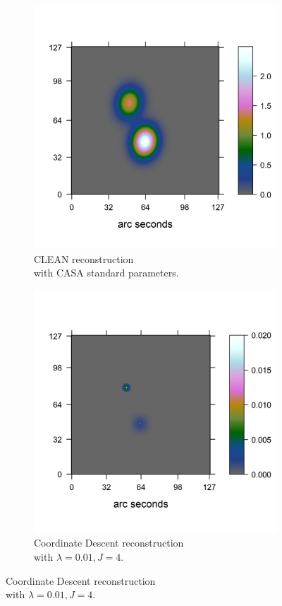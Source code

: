 \begin{figure}[h]
	\centering
	\begin{subfigure}[b]{0.4\linewidth}
		\includegraphics[width=\linewidth, trim={0.2in, 0.2in, 0, 0.2in}, clip]{./chapters/20.results/points/tclean_points.png}
		\caption{CLEAN reconstruction \\with CASA standard parameters.}
		\label{results:points:tclean}
	\end{subfigure}
	\begin{subfigure}[b]{0.4\linewidth}
		\includegraphics[width=\linewidth, trim={0.2in, 0.2in, 0, 0.2in}, clip]{./chapters/20.results/points/cd_points.png}
		\caption{Coordinate Descent reconstruction\\ with $\lambda = 0.01, J=4$.}
		\label{results:points:cd}
	\end{subfigure}
	

\end{figure}
